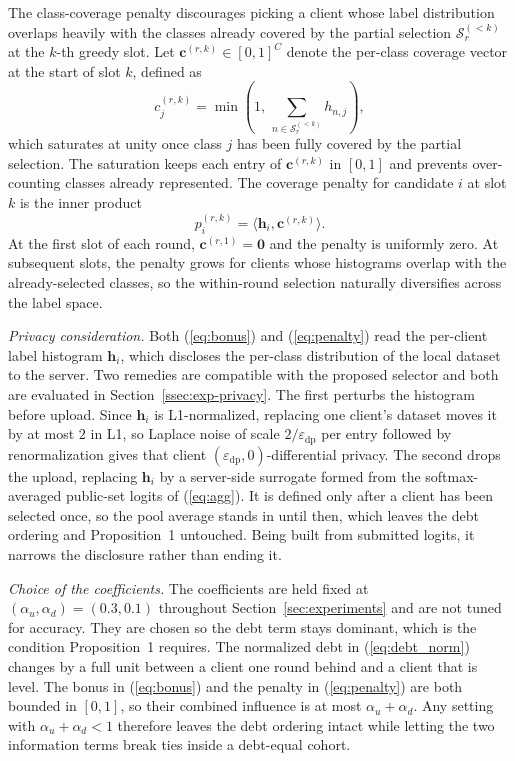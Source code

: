 \documentclass[journal]{IEEEtran}
\newcommand{\new}[1]{#1}
\newcommand{\rev}[1]{#1}
\begin{document}
The class-coverage penalty discourages picking a client whose label distribution overlaps heavily with the classes already covered by the partial selection $\mathcal{S}_r^{(<k)}$ at the $k$-th greedy slot. Let $\bm{c}^{(r,k)} \in [0,1]^{C}$ denote the per-class coverage vector at the start of slot $k$, defined as
\begin{equation}
c_{j}^{(r,k)} = \min\!\left(1,\, \sum_{n \in \mathcal{S}_r^{(<k)}} h_{n,j}\right),
\label{eq:cov}
\end{equation}
which saturates at unity once class $j$ has been fully covered by the partial selection. The saturation keeps each entry of $\bm{c}^{(r,k)}$ in $[0,1]$ and prevents over-counting classes already represented. The coverage penalty for candidate $i$ at slot $k$ is the inner product
\begin{equation}
p_i^{(r,k)} = \langle \bm{h}_i, \bm{c}^{(r,k)} \rangle.
\label{eq:penalty}
\end{equation}
At the first slot of each round, $\bm{c}^{(r,1)} = \bm{0}$ and the penalty is uniformly zero. At subsequent slots, the penalty grows for clients whose histograms overlap with the already-selected classes, so the within-round selection naturally diversifies across the label space.

\new{\textit{Privacy consideration.} Both (\ref{eq:bonus}) and (\ref{eq:penalty}) read the per-client label histogram $\bm{h}_i$, which discloses the per-class distribution of the local dataset to the server. Two remedies are compatible with the proposed selector and both are evaluated in Section~\ref{ssec:exp-privacy}.} \rev{The first perturbs the histogram before upload. Since $\bm{h}_i$ is L1-normalized, replacing one client's dataset moves it by at most $2$ in L1, so Laplace noise of scale $2/\varepsilon_{\mathrm{dp}}$ per entry followed by renormalization gives that client $(\varepsilon_{\mathrm{dp}}, 0)$-differential privacy. The second drops the upload, replacing $\bm{h}_i$ by a server-side surrogate formed from the softmax-averaged public-set logits of (\ref{eq:agg}). It is defined only after a client has been selected once, so the pool average stands in until then, which leaves the debt ordering and Proposition~1 untouched. Being built from submitted logits, it narrows the disclosure rather than ending it.}

\rev{\textit{Choice of the coefficients.} The coefficients are held fixed at $(\alpha_u, \alpha_d) = (0.3, 0.1)$ throughout Section~\ref{sec:experiments} and are not tuned for accuracy. They are chosen so the debt term stays dominant, which is the condition Proposition~1 requires. The normalized debt in (\ref{eq:debt_norm}) changes by a full unit between a client one round behind and a client that is level. The bonus in (\ref{eq:bonus}) and the penalty in (\ref{eq:penalty}) are both bounded in $[0,1]$, so their combined influence is at most $\alpha_u + \alpha_d$. Any setting with $\alpha_u + \alpha_d < 1$ therefore leaves the debt ordering intact while letting the two information terms break ties inside a debt-equal cohort.}
\end{document}
